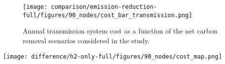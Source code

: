 \documentclass[twocolumn]{article}
\newcommand{\hydrogen}{H$_2$}
\newcommand{\hydrogengrid}{\hydrogen{}--Grid}
\begin{document}
\begin{figure}[ht]
    \centering
    \texttt{[image: comparison/emission-reduction-full/figures/90\_nodes/cost\_bar\_transmission.png]}
    \caption{Annual transmission system cost as a function of the net carbon removal scenarios considered in the study.}
    \label{fig:cost_bar_transmission}
\end{figure}


\begin{figure*}[ht]
    \centering
    \texttt{[image: difference/h2-only-full/figures/90\_nodes/cost\_map.png]}
    \caption{Difference in cost investments between \hydrogengrid{} and Hybrid model. The left subfigure shows higher spendings per technology and region and transport system for the \hydrogengrid{} model, the right shows higher spendings in the Hydrid model.}
    \label{fig:cost_map_difference}
\end{figure*}
\end{document}
